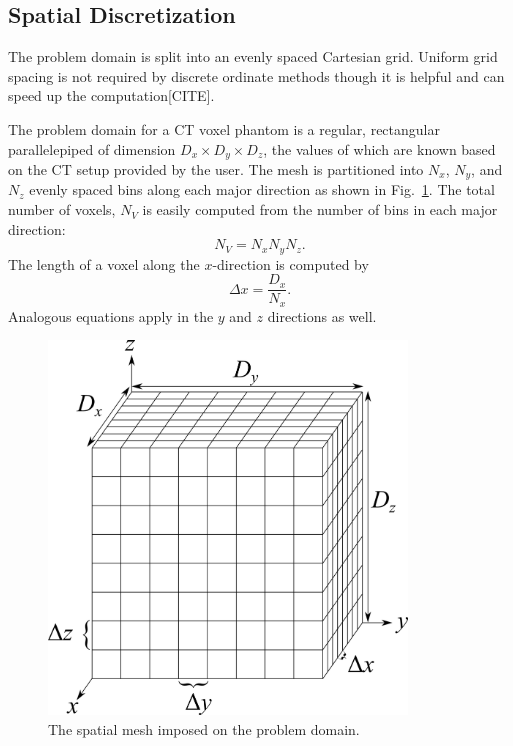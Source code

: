 \subsection{Spatial Discretization}

The problem domain is split into an evenly spaced Cartesian grid. Uniform grid spacing is not required by discrete ordinate methods though it is helpful and can speed up the computation[CITE].

The problem domain for a CT voxel phantom is a regular, rectangular parallelepiped of dimension $D_x \times D_y \times D_z$, the values of which are known based on the CT setup provided by the user. The mesh is partitioned into $N_x$, $N_y$, and $N_z$ evenly spaced bins along each major direction as shown in Fig.~\ref{fig:spatial_disc}. The total number of voxels, $N_V$ is easily computed from the number of bins in each major direction:
\begin{equation} \label{eq:n_v}
N_V = N_x N_y N_z.
\end{equation}
The length of a voxel along the $x$-direction is computed by 
\begin{equation} \label{eq:mesh_x}
\Delta x = \frac{D_x}{N_x}.
\end{equation}
Analogous equations apply in the $y$ and $z$ directions as well.

\begin{figure}[tb]
  \begin{center}
   \includegraphics[width=3.75in]{figs/spatial_disc}
  \end{center}
  \caption{The spatial mesh imposed on the problem domain.}
\label{fig:spatial_disc}
\end{figure}


